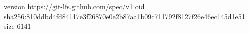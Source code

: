 version https://git-lfs.github.com/spec/v1
oid sha256:810ddbd4fd84117e3f26870e0e2b87aa1b09c711792f8127f26e46ec145d1e51
size 6141
